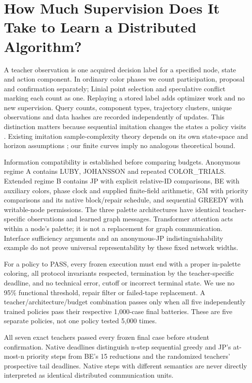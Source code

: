 \documentclass[
  11pt,
]{article}
\begin{document}
\section{How Much Supervision Does It Take to Learn a Distributed
Algorithm?}\label{how-much-supervision-does-it-take-to-learn-a-distributed-algorithm}

A teacher observation is one acquired decision label for a specified
node, state and action component. In ordinary color phases we count
participation, proposal and confirmation separately; Linial point
selection and speculative conflict marking each count as one. Replaying
a stored label adds optimizer work and no new supervision. Query counts,
component types, trajectory clusters, unique observations and data
hashes are recorded independently of updates. This distinction matters
because sequential imitation changes the states a policy visits
\citep{ross2010efficient, ross2011dagger}. Existing imitation
sample-complexity theory depends on its own state-space and horizon
assumptions \citep{rajaraman2020limits}; our finite curves imply no
analogous theoretical bound.

Information compatibility is established before comparing budgets.
Anonymous regime A contains LUBY, JOHANSSON and repeated COLOR\_TRIALS.
Extended regime B contains JP with explicit relative-ID comparisons, BE
with auxiliary colors, phase clock and supplied finite-field arithmetic,
GM with priority comparisons and its native block/repair schedule, and
sequential GREEDY with writable-node permissions. The three palette
architectures have identical teacher-specific observations and learned
graph messages. Transformer attention acts within a node's palette; it
is not a replacement for graph communication. Interface sufficiency
arguments and an anonymous-JP indistinguishability example do not prove
universal representability by these fixed network widths.

For a policy to PASS, every frozen execution must end with a proper
in-palette coloring, all protocol invariants respected, termination by
the teacher-specific deadline, and no technical error, cutoff or
incorrect terminal state. We use no 95\% functional threshold, repair
filter or failed-tape replacement. A teacher/architecture/budget
combination passes only when all five independently trained policies
pass their respective 1,000-case final batteries. These are five
separate policies, not one policy tested 5,000 times.

All seven exact teachers passed every frozen final case before student
confirmation. Native deadlines distinguish n-step sequential greedy and
JP's at-most-n priority steps from BE's 15 reductions and the randomized
teachers' prospective tail deadlines. Native steps with different
semantics are never directly interpreted as identical distributed
communication units.
\end{document}
